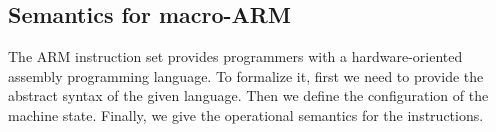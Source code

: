 \documentclass[conference]{IEEEtran}
\begin{document}
\subsection{Semantics for macro-ARM}
The ARM instruction set provides programmers with a hardware-oriented assembly programming language. To formalize it, first we need to provide the abstract syntax of the given language. Then we define the configuration of the machine state. Finally, we give the operational semantics for the instructions.
%
\end{document}

